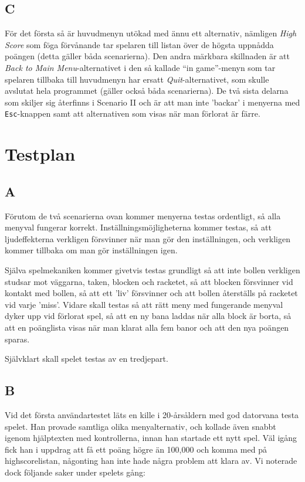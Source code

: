 \documentclass[11pt,a4paper]{article}
\begin{document}
\subsection{C}
För det första så är huvudmenyn utökad med ännu ett alternativ, nämligen \emph{High Score} som föga förvånande tar spelaren till listan över de högsta uppnådda poängen (detta gäller båda scenarierna). Den andra märkbara skillnaden är att \emph{Back to Main Menu}-alternativet i den så kallade ``in game''-menyn som tar spelaren tillbaka till huvudmenyn har ersatt \emph{Quit}-alternativet, som skulle avslutat hela programmet (gäller också båda scenarierna). De två sista delarna som skiljer sig återfinns i Scenario II och är att man inte 'backar' i menyerna med \texttt{Esc}-knappen samt att alternativen som visas när man förlorat är färre.

\section{Testplan}

\subsection{A}
Förutom de två scenarierna ovan kommer menyerna testas ordentligt, så alla menyval fungerar korrekt. Inställningsmöjligheterna kommer testas, så att ljudeffekterna verkligen försvinner när man gör den inställningen, och verkligen kommer tillbaka om man gör inställningen igen.

Själva spelmekaniken kommer givetvis testas grundligt så att inte bollen verkligen studsar mot väggarna, taken, blocken och racketet, så att blocken försvinner vid kontakt med bollen, så att ett 'liv' försvinner och att bollen återställs på racketet vid varje 'miss'. Vidare skall testas så att rätt meny med fungerande menyval dyker upp vid förlorat spel, så att en ny bana laddas när alla block är borta, så att en poänglista visas när man klarat alla fem banor och att den nya poängen sparas.

Självklart skall spelet testas av en tredjepart.

\subsection{B}
Vid det första användartestet läts en kille i 20-årsåldern med god datorvana testa spelet. Han provade samtliga olika menyalternativ, och kollade även snabbt igenom hjälptexten med kontrollerna, innan han startade ett nytt spel. Väl igång fick han i uppdrag att få ett poäng högre än 100,000 och komma med på highscorelistan, någonting han inte hade några problem att klara av.
Vi noterade dock följande saker under spelets gång:
\end{document}
